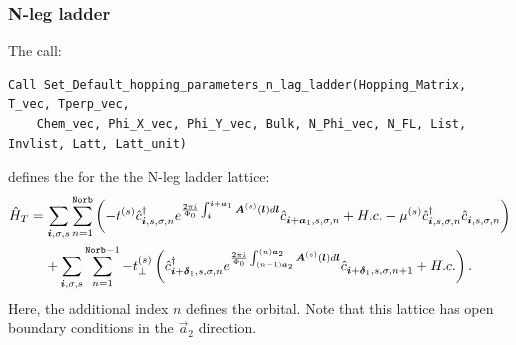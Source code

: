 \subsubsection*{N-leg ladder}
The call:
 \begin{lstlisting}[style=fortran]
Call Set_Default_hopping_parameters_n_lag_ladder(Hopping_Matrix, T_vec, Tperp_vec,
    Chem_vec, Phi_X_vec, Phi_Y_vec, Bulk, N_Phi_vec, N_FL, List, Invlist, Latt, Latt_unit)
\end{lstlisting}  
defines  the   for the  the  N-leg ladder lattice:                 
\begin{multline}
\hat{H}_T  =  \sum_{\boldsymbol{i}, \sigma, s }  \sum_{n=1}^{\texttt{Norb}} \left(      - t^{(s)} \hat{c}^{\dagger}_{\boldsymbol{i},s,\sigma,n}   e^{\frac{2 \pi i}{\Phi_0} \int_{\boldsymbol{i}}^{\boldsymbol{i}+ \boldsymbol{a}_1}  \boldsymbol{A}^{(s)}(\boldsymbol{l})  d \boldsymbol{l}}   \hat{c}^{}_{\boldsymbol{i} + \boldsymbol{a}_1,s,\sigma,n} +  H.c.       -  \mu^{(s)} \hat{c}^{\dagger}_{\boldsymbol{i},s,\sigma,n} \hat{c}^{}_{\boldsymbol{i},s,\sigma,n}  \right)    \\
     + \sum_{\boldsymbol{i}, \sigma, s } \sum_{n=1}^{\texttt{Norb}-1}  -  t_{\perp}^{(s)}  \left( 
                   \hat{c}^{\dagger}_{\boldsymbol{i} + \boldsymbol{\delta}_1,s,\sigma,n}  e^{\frac{2 \pi i}{\Phi_0} \int_{(n-1)\boldsymbol{a}_2}^{(n)\boldsymbol{a}_2}  \boldsymbol{A}^{(s)}(\boldsymbol{l})  d \boldsymbol{l}}    \hat{c}^{}_{\boldsymbol{i} + \boldsymbol{\delta}_1,s,\sigma,n+1}  + H.c.  \right). 
\end{multline}
Here, the additional  index  $n$  defines  the orbital.  Note that this lattice  has open boundary conditions in the $\vec{a}_2$  direction. 
